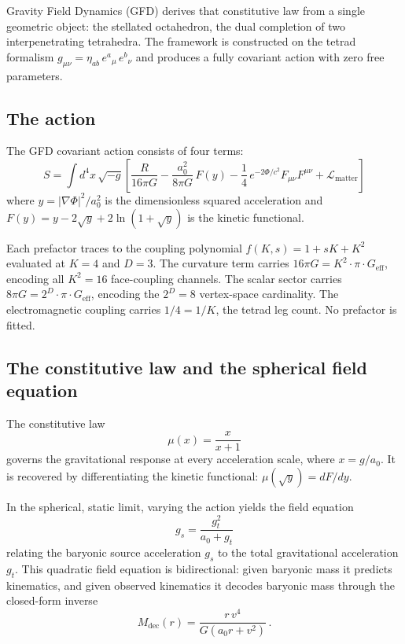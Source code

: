 \documentclass[twocolumn,showpacs,preprintnumbers,amsmath,amssymb,prd]{revtex4-2}
\begin{document}
Gravity Field Dynamics (GFD) derives that constitutive law from a single geometric object: the stellated octahedron, the dual completion of two interpenetrating tetrahedra. The framework is constructed on the tetrad formalism $g_{\mu\nu} = \eta_{ab}\, e^a{}_\mu\, e^b{}_\nu$ and produces a fully covariant action with zero free parameters.

\subsection{The action}

The GFD covariant action consists of four terms:
\begin{equation}
\label{eq:gfd_action}
S = \int d^4x\,\sqrt{-g}\left[\frac{R}{16\pi G} - \frac{a_0^2}{8\pi G}\,F(y) - \frac{1}{4}\,e^{-2\Phi/c^2} F_{\mu\nu}F^{\mu\nu} + \mathcal{L}_\mathrm{matter}\right]
\end{equation}
where $y = |\nabla\Phi|^2/a_0^2$ is the dimensionless squared acceleration and $F(y) = y - 2\sqrt{y} + 2\ln(1+\sqrt{y})$ is the kinetic functional.

Each prefactor traces to the coupling polynomial $f(K,s) = 1 + sK + K^2$ evaluated at $K = 4$ and $D = 3$. The curvature term carries $16\pi G = K^2 \cdot \pi \cdot G_\mathrm{eff}$, encoding all $K^2 = 16$ face-coupling channels. The scalar sector carries $8\pi G = 2^D \cdot \pi \cdot G_\mathrm{eff}$, encoding the $2^D = 8$ vertex-space cardinality. The electromagnetic coupling carries $1/4 = 1/K$, the tetrad leg count. No prefactor is fitted.

\subsection{The constitutive law and the spherical field equation}

The constitutive law
\begin{equation}
\label{eq:constitutive}
\mu(x) = \frac{x}{x+1}
\end{equation}
governs the gravitational response at every acceleration scale, where $x = g/a_0$. It is recovered by differentiating the kinetic functional: $\mu(\sqrt{y}) = dF/dy$.

In the spherical, static limit, varying the action yields the field equation
\begin{equation}
\label{eq:sst}
g_s = \frac{g_t^2}{a_0 + g_t}
\end{equation}
relating the baryonic source acceleration $g_s$ to the total gravitational acceleration $g_t$. This quadratic field equation is bidirectional: given baryonic mass it predicts kinematics, and given observed kinematics it decodes baryonic mass through the closed-form inverse
\begin{equation}
\label{eq:decode}
M_\mathrm{dec}(r) = \frac{r\,v^4}{G(a_0 r + v^2)}\,.
\end{equation}
\end{document}
